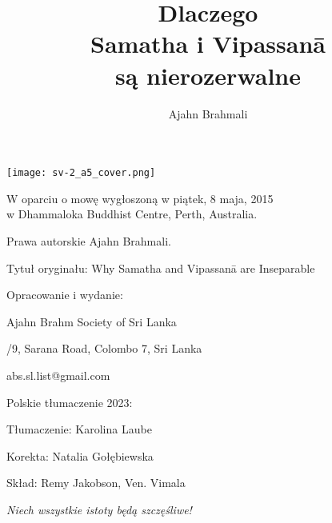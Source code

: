 \documentclass[12pt,openany]{book}
\title{ Dlaczego \protect\\ Samatha i Vipassanā \protect\\ są nierozerwalne}
\author{Ajahn Brahmali}
\date{}
\begin{document}
\frontmatter
\pagestyle{empty}

\hspace*{-156mm}
\texttt{[image: sv-2\_a5\_cover.png]}





\restoregeometry

\begin{center}\end{center}

\vspace{4em}
{\small
\noindent W oparciu o mowę wygłoszoną w piątek, 8 maja, 2015 \\w Dhammaloka Buddhist Centre, Perth, Australia.

\bigskip

\noindent Prawa autorskie Ajahn Brahmali.

\medskip

\noindent Tytuł oryginału:  Why Samatha and Vipassanā are Inseparable

\bigskip

\noindent Opracowanie i wydanie:

\medskip

\noindent Ajahn Brahm Society of Sri Lanka

/9, Sarana Road, Colombo 7, Sri Lanka

\noindent abs.sl.list@gmail.com

\bigskip

\noindent Polskie tłumaczenie 2023:

\medskip

\noindent Tłumaczenie: Karolina Laube

\noindent Korekta: Natalia Gołębiewska

\noindent Skład: Remy Jakobson, Ven. Vimala

}

\vfill

\begin{center}
\textit{ Niech wszystkie istoty będą szczęśliwe!}

\end{center}
\vfill
\end{document}

